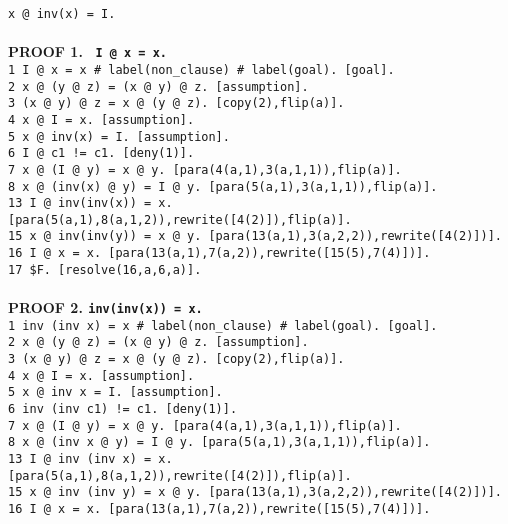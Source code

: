 \documentclass[a4paper]{article}
\begin{document}
{	{\tt x @ inv(x) = I.}
	\\
	\\
	\textbf{PROOF 1. \tt{ I @ x = x.}}\\     
	{\tt 1 I @ x = x \# label(non\_clause) \# label(goal).  [goal].}\\
	{\tt 2 x @ (y @ z) = (x @ y) @ z.  [assumption].}\\
	{\tt 3 (x @ y) @ z = x @ (y @ z).  [copy(2),flip(a)].}\\
	{\tt 4 x @ I = x.  [assumption].}\\
	{\tt 5 x @ inv(x) = I.  [assumption].}\\
	{\tt 6 I @ c1 != c1.  [deny(1)].}\\
	{\tt 7 x @ (I @ y) = x @ y.  [para(4(a,1),3(a,1,1)),flip(a)].}\\
	{\tt 8 x @ (inv(x) @ y) = I @ y.  [para(5(a,1),3(a,1,1)),flip(a)].}\\
	{\tt 13 I @ inv(inv(x)) = x.  [para(5(a,1),8(a,1,2)),rewrite([4(2)]),flip(a)].}\\
	{\tt 15 x @ inv(inv(y)) = x @ y.  [para(13(a,1),3(a,2,2)),rewrite([4(2)])].}\\
	{\tt 16 I @ x = x.  [para(13(a,1),7(a,2)),rewrite([15(5),7(4)])].}\\
	{\tt 17 \$F.  [resolve(16,a,6,a)].}\\
	\\
	\textbf{PROOF 2. {\tt  inv(inv(x)) = x.}}\\        
	{\tt 1 inv (inv x) = x \# label(non\_clause) \# label(goal).  [goal].}\\
	{\tt 2 x @ (y @ z) = (x @ y) @ z.  [assumption].}\\
	{\tt 3 (x @ y) @ z = x @ (y @ z).  [copy(2),flip(a)].}\\
	{\tt 4 x @ I = x.  [assumption].}\\
	{\tt 5 x @ inv x = I.  [assumption].}\\
	{\tt 6 inv (inv c1) != c1.  [deny(1)].}\\
	{\tt 7 x @ (I @ y) = x @ y.  [para(4(a,1),3(a,1,1)),flip(a)].}\\
	{\tt 8 x @ (inv x @ y) = I @ y.  [para(5(a,1),3(a,1,1)),flip(a)].}\\
	{\tt 13 I @ inv (inv x) = x.  [para(5(a,1),8(a,1,2)),rewrite([4(2)]),flip(a)].}\\
	{\tt 15 x @ inv (inv y) = x @ y.  [para(13(a,1),3(a,2,2)),rewrite([4(2)])].}\\
	{\tt 16 I @ x = x.  [para(13(a,1),7(a,2)),rewrite([15(5),7(4)])].}\\
}
\end{document}
